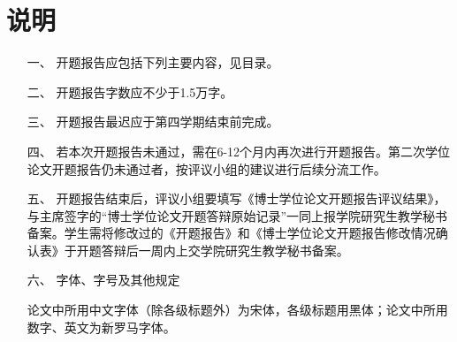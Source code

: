 \documentclass[proposal]{sysuthesis}
\begin{document}
\frontmatter

\maketitle

\tableofcontents

\mainmatter


\section*{说\hspace*{2\ccwd}明}

\begin{itemize}
    \item[一、]开题报告应包括下列主要内容，见目录。
    \item[二、]开题报告字数应不少于1.5万字。
    \item[三、]开题报告最迟应于第四学期结束前完成。
    \item[四、]若本次开题报告未通过，需在6-12个月内再次进行开题报告。第二次学位论文开题报告仍未通过者，按评议小组的建议进行后续分流工作。
    \item[五、]开题报告结束后，评议小组要填写《博士学位论文开题报告评议结果》，与主席签字的“博士学位论文开题答辩原始记录”一同上报学院研究生教学秘书备案。学生需将修改过的《开题报告》和《博士学位论文开题报告修改情况确认表》于开题答辩后一周内上交学院研究生教学秘书备案。
    \item[六、]字体、字号及其他规定
    
    论文中所用中文字体（除各级标题外）为宋体，各级标题用黑体；论文中所用数字、英文为新罗马字体。


\end{itemize}
\end{document}
